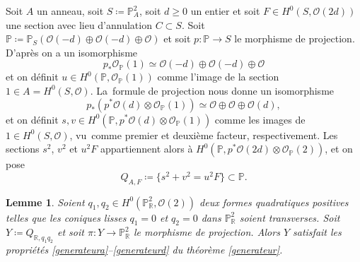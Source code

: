\documentclass[11pt]{article}
\newtheorem{lemma}[thm]{Lemme}
\theoremstyle{definition}
\newcommand{\R}{\mathbb R}
\renewcommand{\P}{\mathbb P}
\newcommand{\mc}[1]{\mathcal{#1}}
\begin{document}
Soit $A$ un anneau, soit $S\coloneqq \P^2_A$, soit $d\geq 0$ un entier et soit $F \in H^0(S, \mc{O}(2d))$ une section avec lieu d'annulation $C\subset S$. Soit $\P \coloneqq \P_S(\mc{O}(-d) \oplus \mc{O}(-d) \oplus \mathcal{O})$ et soit $p\colon \P\to S$ le morphisme de projection. D'après \cite[Ch.\,2, Prop.\,7.11(a)]{hartshorne} on a un isomorphisme \[p_* \mathcal{O}_{\P}(1) \simeq \mc{O}(-d) \oplus \mc{O}(-d) \oplus \mathcal{O}\] et on définit $u \in H^0(\P, \mathcal{O}_{\P}(1))$ comme l'image de la section $1\in A=H^0(S,\mc{O})$.
La~formule de projection nous donne un isomorphisme
\[ p_*(p^*\mc{O}(d) \otimes \mathcal{O}_{\P}(1)) \simeq \mathcal{O} \oplus \mathcal{O} \oplus \mc{O}(d),\]
et on définit $s, v \in H^0(\P, p^*\mc{O}(d) \otimes \mathcal{O}_{\P}(1))$ comme les images de $1\in H^0(S,\mc{O})$, vu~com\-me premier et deuxième facteur, respectivement. Les sections $s^2$, $v^2$ et $u^2F$ appartiennent alors à $H^0(\P,p^*\mc{O}(2d)\otimes \mc{O}_\P(2))$, et on pose
\[Q_{A,F}\coloneqq \{s^2+v^2=u^2F\}\subset \P.\]

\begin{lemma}\label{refBW}
Soient $q_1,q_2\in H^0(\P^2_\R, \mc{O}(2))$ deux formes quadratiques positives telles que les coniques lisses $q_1=0$ et $q_2=0$ dans $\P^2_\R$ soient transverses. Soit $Y\coloneqq Q_{\R, q_1q_2}$ et soit $\pi \colon Y \to \P^2_{\R}$ le morphisme de projection. Alors $Y$ satisfait les propriétés \eqref{generateura}--\eqref{generateurd} du théorème \ref{generateur}.
\end{lemma}
\end{document}
